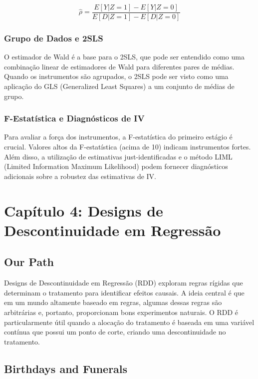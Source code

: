 \documentclass[a4paper,12pt]{article}[abntex2]
\begin{document}
\begin{equation}
    \hat{\rho} = \frac{E[Y|Z=1] - E[Y|Z=0]}{E[D|Z=1] - E[D|Z=0]}
\end{equation}

\subsubsection*{Grupo de Dados e 2SLS}

O estimador de Wald é a base para o 2SLS, que pode ser entendido como uma combinação linear de estimadores de Wald para diferentes pares de médias. Quando os instrumentos são agrupados, o 2SLS pode ser visto como uma aplicação do GLS (Generalized Least Squares) a um conjunto de médias de grupo.

\subsubsection*{F-Estatística e Diagnósticos de IV}

Para avaliar a força dos instrumentos, a F-estatística do primeiro estágio é crucial. Valores altos da F-estatística (acima de 10) indicam instrumentos fortes. Além disso, a utilização de estimativas just-identificadas e o método LIML (Limited Information Maximum Likelihood) podem fornecer diagnósticos adicionais sobre a robustez das estimativas de IV.

\newpage

\section{Capítulo 4: Designs de Descontinuidade em Regressão}

\subsection*{Our Path}

Designs de Descontinuidade em Regressão (RDD) exploram regras rígidas que determinam o tratamento para identificar efeitos causais. A ideia central é que em um mundo altamente baseado em regras, algumas dessas regras são arbitrárias e, portanto, proporcionam bons experimentos naturais. O RDD é particularmente útil quando a alocação do tratamento é baseada em uma variável contínua que possui um ponto de corte, criando uma descontinuidade no tratamento.

\subsection{Birthdays and Funerals}
\end{document}

